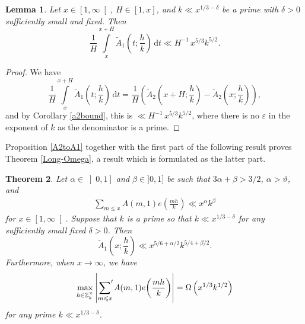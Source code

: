 \documentclass[a4paper,10pt,twoside]{amsart}
\newtheorem{theorem}{Theorem}[section]
\newtheorem{lemma}[theorem]{Lemma}
\theoremstyle{definition}
\numberwithin{equation}{section}
\newcommand\eps{\varepsilon}
\renewcommand\:{\colon}
\newcommand{\sump}{\mathop{{\sum}^{\raisebox{-3pt}{\makebox[0pt][l]{$'$}}}}}
\begin{document}
\begin{lemma}\label{A_1-on-avg}
Let $x\in\left[1,\infty\right[$, $H\in\left[1,x\right]$, and $k\ll x^{1/3-\delta}$ be a prime with $\delta>0$ sufficiently small and fixed. Then
\[\frac1H\int\limits_x^{x+H}\widetilde A_1\left(t;\frac hk\right)\,\mathrm dt\ll H^{-1}\,x^{5/3}k^{5/2}.\]
\end{lemma}

\begin{proof}  
We have
\[\frac1H\int\limits_x^{x+H}\widetilde A_1\left(t;\frac hk\right)\,\mathrm dt
=\frac1H\left(\widetilde A_2\left(x+H;\frac hk\right)-\widetilde A_2\left(x;\frac hk\right)\right),\]
and by Corollary \ref{a2bound}, this is $\ll H^{-1}\,x^{5/3}k^{5/2}$, where there is no $\eps$ in the exponent of $k$ as the denominator is a prime.
\end{proof}

\noindent Proposition \ref{A2toA1} together with the first part of the following result proves Theorem \ref{Long-Omega}, a result which is formulated as the latter part. 

\begin{theorem}\label{long-omega}
Let $\alpha\in\left]0,1\right]$ and $\beta\in]0,1]$ be such that $3\alpha+\beta>3/2$, $\alpha>\vartheta$, and 
\begin{align}\label{exp-sum-bound}
\sum_{m\leqslant x}A(m,1)e\left(\frac{mh}k\right)\ll x^\alpha k^\beta
\end{align}
for $x\in\left[1,\infty\right[$. Suppose that $k$ is a prime so that $k\ll x^{1/3-\delta}$ for any sufficiently small fixed $\delta>0$. Then 
\[\widetilde A_1\left(x;\frac hk\right)\ll x^{5/6+\alpha/2}k^{5/4+\beta/2}.\]
Furthermore, when $x\longrightarrow\infty$, we have
\[\underset{h\in\mathbb Z_k^\times}{\max}\left|\sump_{m\leqslant x}A(m,1)e\!\left(\frac{mh}k\right)\right|=\Omega\left(x^{1/3}k^{1/2}\right)\]
for any prime $k\ll x^{1/3-\delta}$.
\end{theorem}
\end{document}
